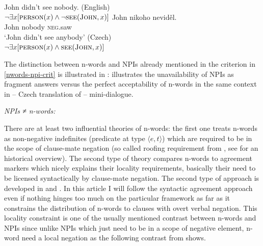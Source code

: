 \documentclass[output=paper,
]{langscibook}
\begin{document}
\ea\label{ex-4} \ea\label{ex-4-a} John didn't see nobody. \hfill (English)\\
$\neg \exists x[\textsc{person}(x) \wedge \neg \textsc{see}(\textsc{John},x)]$
\ex \label{ex-4-b}\gll  John nikoho neviděl.\\
John nobody \textsc{neg}.saw\\
\glt `John didn't see anybody' \hfill (Czech)\\
$\neg \exists x[\textsc{person}(x) \wedge \textsc{see}(\textsc{John},x)]$
\z
\z

\noindent The distinction between n-words and NPIs already mentioned in the criterion in \ref{nwords-npi-crit} is illustrated in :  illustrates the unavailability of NPIs as fragment answers versus the perfect acceptability of n-words in the same context in  -- Czech translation of  --  mini-dialogue.

\ea \textit{NPIs ≠ n-words:}\label{ex-5}
\label{ex-5-b}
\z
\z

\noindent There are at least two influential theories of n-words: the first one treats n-words as non-negative indefinites (predicate at type $\langle e,t\rangle$) which are required to be in the scope of clause-mate negation (so called roofing requirement from \cite{ladusaw1992expressing}, see \cite{giannakidou1997landscape} for an historical overview). The second type of theory compares n-words to agreement markers which nicely explains their locality requirements, basically their need to be licensed syntactically by clause-mate negation. The second type of approach is developed in  \cite{zeijlstra2004sentential} and \cite{zeijlstra2008negative}. In this article I will follow the syntactic agreement approach even if nothing hinges too much on the particular framework as far as it constrains the distribution of n-words to clauses with overt verbal negation. This locality constraint is one of the usually mentioned contrast between n-words and NPIs since unlike  NPIs which just need to be in a scope of negative element, n-word need a local negation as the following contrast from \cite{giannakidou2017landscape} shows.
\end{document}
